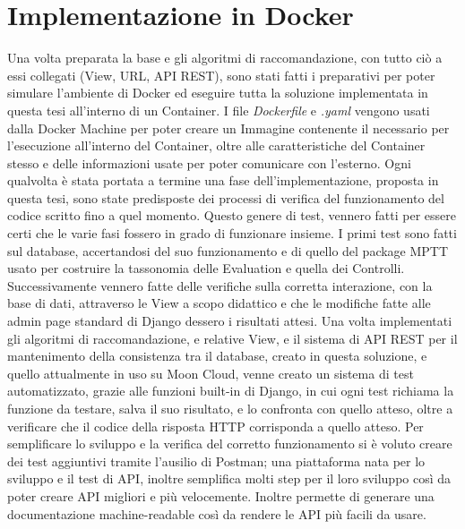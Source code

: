 \section*{Implementazione in Docker}
Una volta preparata la base e gli algoritmi di raccomandazione, con tutto ciò a essi collegati (View, URL, API REST), sono stati fatti i 
preparativi per poter simulare l'ambiente di Docker ed eseguire tutta la soluzione implementata in questa tesi all'interno di un 
Container.\hfill\break
I file \textit{Dockerfile} e \textit{.yaml} vengono usati dalla Docker Machine per poter creare un Immagine contenente il necessario per l'esecuzione 
all'interno del Container, oltre alle caratteristiche del Container stesso e delle informazioni usate per poter comunicare con l'esterno. 
%
\vspace{1.5 cm}
\hfill\break
Ogni qualvolta è stata portata a termine una fase dell'implementazione, proposta in questa tesi, sono state predisposte 
dei processi di verifica del funzionamento del codice scritto fino a quel momento. Questo genere di test, vennero fatti 
per essere certi che le varie fasi fossero in grado di funzionare insieme.\hfill\break
I primi test sono fatti sul database, accertandosi del suo funzionamento e di quello del package MPTT usato 
per costruire la tassonomia delle Evaluation e quella dei Controlli. Successivamente vennero fatte delle verifiche sulla 
corretta interazione, con la base di dati, attraverso le View a scopo didattico e che le modifiche fatte alle admin page 
standard di Django dessero i risultati attesi. Una volta implementati gli algoritmi di raccomandazione, e relative View, 
e il sistema di API REST per il mantenimento della consistenza tra il database, creato in questa soluzione, e quello 
attualmente in uso su Moon Cloud, venne creato un sistema di test automatizzato, grazie alle funzioni built-in di Django, 
in cui ogni test richiama la funzione da testare, salva il suo risultato, e lo confronta con quello atteso, 
oltre a verificare che il codice della risposta HTTP corrisponda a quello atteso.\hfill\break
Per semplificare lo sviluppo e la verifica del corretto funzionamento si è voluto creare dei test aggiuntivi tramite 
l'ausilio di Postman; una piattaforma nata per lo sviluppo e il test di API, inoltre semplifica molti step per il loro 
sviluppo così da poter creare API migliori e più velocemente. Inoltre permette di generare una documentazione 
machine-readable così da rendere le API più facili da usare.
